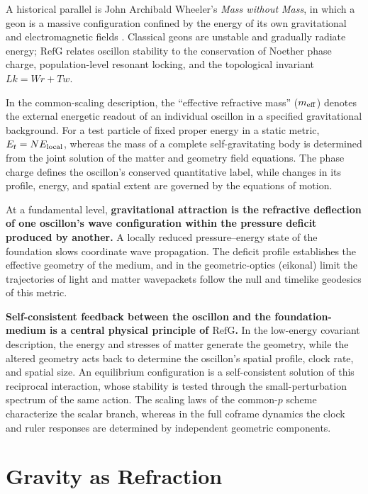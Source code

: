 \documentclass[11pt,a4paper]{article}
\newcommand{\RefG}{\mathrm{RefG}}
\begin{document}
A historical parallel is John Archibald Wheeler's \emph{Mass without Mass}, in which a geon is a massive configuration confined by the energy of its own gravitational and electromagnetic fields \citep{wheeler1955}. Classical geons are unstable and gradually radiate energy; $\RefG$ relates oscillon stability to the conservation of Noether phase charge, population-level resonant locking, and the topological invariant $Lk = Wr + Tw$.

In the common-scaling description, the ``effective refractive mass'' ($m_{\rm eff}$) denotes the external energetic readout of an individual oscillon in a specified gravitational background. For a test particle of fixed proper energy in a static metric, $E_t = N E_{\rm local}$, whereas the mass of a complete self-gravitating body is determined from the joint solution of the matter and geometry field equations. The phase charge defines the oscillon's conserved quantitative label, while changes in its profile, energy, and spatial extent are governed by the equations of motion.

At a fundamental level, \textbf{gravitational attraction is the refractive deflection of one oscillon's wave configuration within the pressure deficit produced by another.} A locally reduced pressure--energy state of the foundation slows coordinate wave propagation. The deficit profile establishes the effective geometry of the medium, and in the geometric-optics (eikonal) limit the trajectories of light and matter wavepackets follow the null and timelike geodesics of this metric.

\textbf{Self-consistent feedback between the oscillon and the foundation-medium is a central physical principle of $\RefG$.} In the low-energy covariant description, the energy and stresses of matter generate the geometry, while the altered geometry acts back to determine the oscillon's spatial profile, clock rate, and spatial size. An equilibrium configuration is a self-consistent solution of this reciprocal interaction, whose stability is tested through the small-perturbation spectrum of the same action. The scaling laws of the common-$p$ scheme characterize the scalar branch, whereas in the full coframe dynamics the clock and ruler responses are determined by independent geometric components.

\section{Gravity as Refraction}
\end{document}
